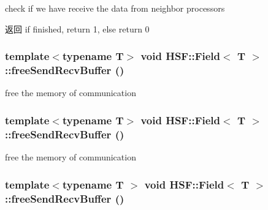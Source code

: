 check if we have receive the data from neighbor processors \begin{DoxyReturn}{返回}
if finished, return 1, else return 0 
\end{DoxyReturn}
\hypertarget{classHSF_1_1Field_a646bc44e3bd328d6b6ead58f91ae662c}{
\subsubsection[{freeSendRecvBuffer}]{\setlength{\rightskip}{0pt plus 5cm}template$<$typename T$>$ void {\bf HSF::Field}$<$ T $>$::freeSendRecvBuffer ()}}
\label{classHSF_1_1Field_a646bc44e3bd328d6b6ead58f91ae662c}


free the memory of communication \hypertarget{classHSF_1_1Field_a646bc44e3bd328d6b6ead58f91ae662c}{
\subsubsection[{freeSendRecvBuffer}]{\setlength{\rightskip}{0pt plus 5cm}template$<$typename T$>$ void {\bf HSF::Field}$<$ T $>$::freeSendRecvBuffer ()}}
\label{classHSF_1_1Field_a646bc44e3bd328d6b6ead58f91ae662c}


free the memory of communication \hypertarget{classHSF_1_1Field_a646bc44e3bd328d6b6ead58f91ae662c}{
\subsubsection[{freeSendRecvBuffer}]{\setlength{\rightskip}{0pt plus 5cm}template$<$typename T $>$ void {\bf HSF::Field}$<$ T $>$::freeSendRecvBuffer ()}}
\label{classHSF_1_1Field_a646bc44e3bd328d6b6ead58f91ae662c}


